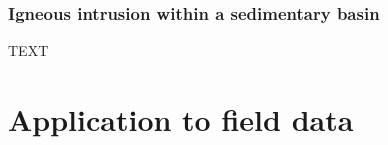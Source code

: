 \documentclass[journal abbreviation, npg]{copernicus}
\begin{document}
%

\subsubsection{Igneous intrusion within a sedimentary basin}

TEXT

\section{Application to field data}
\end{document}
